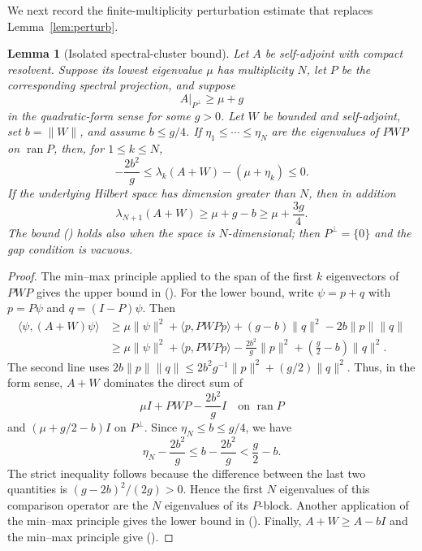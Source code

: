 \documentclass[twoside,10pt]{article}
\numberwithin{equation}{section}
\theoremstyle{slbody}
\newtheorem{lemma}[theorem]{Lemma}
\theoremstyle{definition}
\newcommand{\ip}[2]{\langle #1,#2\rangle}
\newcommand{\norm}[1]{\lVert #1\rVert}
\renewcommand{\eqref}[1]{%
  \textup{{\normalfont(\oldstylenums{\ref{#1}}}\normalfont)}}
\begin{document}
We next record the finite-multiplicity perturbation estimate that replaces
Lemma~\ref{lem:perturb}.

\begin{lemma}[Isolated spectral-cluster bound]\label{lem:cluster}
Let $A$ be self-adjoint with compact resolvent.  Suppose its lowest
eigenvalue $\mu$ has multiplicity $N$, let $P$ be the corresponding spectral
projection, and suppose
\[
 A\big|_{P^\perp}\geq\mu+g
\]
in the quadratic-form sense for some $g>0$.  Let $W$ be bounded and
self-adjoint, set $b=\norm W$, and assume $b\leq g/4$.  If
$\eta_1\leq\cdots\leq\eta_N$ are the eigenvalues of $PWP$ on
$\operatorname{ran}P$, then, for $1\leq k\leq N$,
\begin{equation}\label{eq:cluster-bound}
 -\frac{2b^2}{g}
 \leq\lambda_k(A+W)-(\mu+\eta_k)\leq0.
\end{equation}
If the underlying Hilbert space has dimension greater than $N$, then in
addition
\begin{equation}\label{eq:cluster-separation}
 \lambda_{N+1}(A+W)\geq\mu+g-b\geq\mu+\frac{3g}{4}.
\end{equation}
The bound \eqref{eq:cluster-bound} holds also when the space is
$N$-dimensional; then $P^\perp=\{0\}$ and the gap condition is vacuous.
\end{lemma}

\begin{proof}
The min--max principle applied to the span of the first $k$ eigenvectors of
$PWP$ gives the upper bound in \eqref{eq:cluster-bound}.  For the lower
bound, write $\psi=p+q$ with $p=P\psi$ and $q=(I-P)\psi$.  Then
\begin{align*}
 \ip{\psi}{(A+W)\psi}
 &\geq\mu\norm\psi^2+\ip{p}{PWPp}
 +(g-b)\norm q^2-2b\norm p\norm q\\
 &\geq\mu\norm\psi^2+\ip{p}{PWPp}
 -\frac{2b^2}{g}\norm p^2
 +\left(\frac g2-b\right)\norm q^2.
\end{align*}
The second line uses
$2b\norm p\norm q\leq2b^2g^{-1}\norm p^2+(g/2)\norm q^2$.
Thus, in the form sense, $A+W$ dominates the direct sum of
\[
 \mu I+PWP-\frac{2b^2}{g}I
 \quad\text{on }\operatorname{ran}P
\]
and $(\mu+g/2-b)I$ on $P^\perp$.  Since
$\eta_N\leq b\leq g/4$, we have
\[
 \eta_N-\frac{2b^2}{g}
 \leq b-\frac{2b^2}{g}<\frac g2-b.
\]
The strict inequality follows because the difference between the last two
quantities is $(g-2b)^2/(2g)>0$.
Hence the first $N$ eigenvalues of this comparison operator are the $N$
eigenvalues of its $P$-block.  Another
application of the min--max principle gives the lower bound in
\eqref{eq:cluster-bound}.  Finally, $A+W\geq A-bI$ and the min--max principle
give \eqref{eq:cluster-separation}.
\end{proof}
\end{document}
